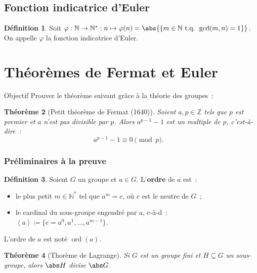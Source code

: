 \documentclass[10pt, mathserif]{beamer}
\DeclareMathOperator{\ord}{ord}
\newcommand{\tq}{\text{ t.q. }}
\newcommand{\Z}{\mathbb Z}
\newcommand{\N}{\mathbb N}
\newcommand{\eng}[1]{\left\langle#1\right\rangle}
\newtheorem{thm}{Théorème}[section]
\newtheorem{lem}[thm]{Lemme}
\theoremstyle{definition}
\newtheorem{déf}[thm]{Définition}
\theoremstyle{remark}
\begin{document}
	\subsection{Fonction indicatrice d'Euler}
	\begin{frame}
		\begin{déf}
			Soit $\varphi : \N \to \N^* : n \mapsto \varphi(n) = \abs {\{m \in \N \tq \gcd(m, n) = 1\}}$. On appelle $\varphi$ la fonction
			indicatrice d'Euler.
		\end{déf}

	\end{frame}
	
\section{Théorèmes de Fermat et Euler}
	\begin{frame}
		\begin{block}{Objectif}
			Prouver le théorème suivant grâce à la théorie des groupes~:
		\end{block}

		\begin{thm}[Petit théorème de Fermat (1640)]
			Soient $a, p \in\Z$ tels que $p$ est premier et $a$ n'est pas divisible par $p$. Alors $a^{p-1} - 1$ est un multiple de $p$, c'est-à-dire~:
			\[a^{p-1}-1 \equiv 0 \pmod p.\]
		\end{thm}
	\end{frame}

	\begin{frame}
		\frametitle{Préliminaires à la preuve}
		\begin{déf}
			Soient $G$ un groupe et $a \in G$. L'\textbf{ordre} de $a$ est~:
			\begin{itemize}
				\item le plus petit $m \in \N^*$ tel que $a^m = e$, où $e$ est le neutre de $G$~;
				\item le cardinal du sous-groupe engendré par $a$, c-à-d~: $\eng a \coloneqq \{e = a^0, a^1, \dotsc, a^{m-1}\}$.
			\end{itemize}

			L'ordre de $a$ est noté $\ord(a)$.
		\end{déf}

		\begin{thm}[Thorème de Lagrange]
			Si $G$ est un groupe fini et $H \subseteq G$ un sous-groupe, alors $\abs H$ divise $\abs G$.
		\end{thm}
	\end{frame}
\end{document}
